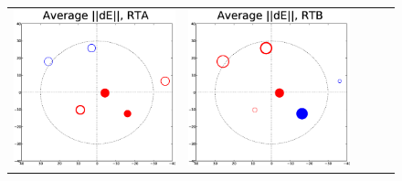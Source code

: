 \documentclass[]{aa}
\begin{document}
\begin{figure}
\begin{tabular}{@{}c@{}c@{}c@{}c@{}c@{}}
\includegraphics[width=\roguewidth]{o2003_dE_antA} &
\includegraphics[width=\roguewidth]{o2003_dE_antB} &

\end{tabular}
\end{figure}
\end{document}
